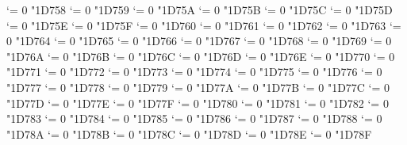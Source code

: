 {  \Umathcode `\Γ = 0 \unimathfam "1D758
  \Umathcode `\Δ = 0 \unimathfam "1D759
  \Umathcode `\Ε = 0 \unimathfam "1D75A
  \Umathcode `\Ζ = 0 \unimathfam "1D75B
  \Umathcode `\Η = 0 \unimathfam "1D75C
  \Umathcode `\Θ = 0 \unimathfam "1D75D
  \Umathcode `\Ι = 0 \unimathfam "1D75E
  \Umathcode `\Κ = 0 \unimathfam "1D75F
  \Umathcode `\Λ = 0 \unimathfam "1D760
  \Umathcode `\Μ = 0 \unimathfam "1D761
  \Umathcode `\Ν = 0 \unimathfam "1D762
  \Umathcode `\Ξ = 0 \unimathfam "1D763
  \Umathcode `\Ο = 0 \unimathfam "1D764
  \Umathcode `\Π = 0 \unimathfam "1D765
  \Umathcode `\Ρ = 0 \unimathfam "1D766
  \Umathcode `\ϴ = 0 \unimathfam "1D767
  \Umathcode `\Σ = 0 \unimathfam "1D768
  \Umathcode `\Τ = 0 \unimathfam "1D769
  \Umathcode `\Υ = 0 \unimathfam "1D76A
  \Umathcode `\Φ = 0 \unimathfam "1D76B
  \Umathcode `\Χ = 0 \unimathfam "1D76C
  \Umathcode `\Ψ = 0 \unimathfam "1D76D
  \Umathcode `\Ω = 0 \unimathfam "1D76E
  \Umathcode `\α = 0 \unimathfam "1D770
  \Umathcode `\β = 0 \unimathfam "1D771
  \Umathcode `\γ = 0 \unimathfam "1D772
  \Umathcode `\δ = 0 \unimathfam "1D773
  \Umathcode `\ε = 0 \unimathfam "1D774
  \Umathcode `\ζ = 0 \unimathfam "1D775
  \Umathcode `\η = 0 \unimathfam "1D776
  \Umathcode `\θ = 0 \unimathfam "1D777
  \Umathcode `\ι = 0 \unimathfam "1D778
  \Umathcode `\κ = 0 \unimathfam "1D779
  \Umathcode `\λ = 0 \unimathfam "1D77A
  \Umathcode `\μ = 0 \unimathfam "1D77B
  \Umathcode `\ν = 0 \unimathfam "1D77C
  \Umathcode `\ξ = 0 \unimathfam "1D77D
  \Umathcode `\ο = 0 \unimathfam "1D77E
  \Umathcode `\π = 0 \unimathfam "1D77F
  \Umathcode `\ρ = 0 \unimathfam "1D780
  \Umathcode `\ς = 0 \unimathfam "1D781
  \Umathcode `\σ = 0 \unimathfam "1D782
  \Umathcode `\τ = 0 \unimathfam "1D783
  \Umathcode `\υ = 0 \unimathfam "1D784
  \Umathcode `\ϕ = 0 \unimathfam "1D785
  \Umathcode `\χ = 0 \unimathfam "1D786
  \Umathcode `\ψ = 0 \unimathfam "1D787
  \Umathcode `\ω = 0 \unimathfam "1D788
  \Umathcode `\ϵ = 0 \unimathfam "1D78A
  \Umathcode `\ϑ = 0 \unimathfam "1D78B
  \Umathcode `\ϰ = 0 \unimathfam "1D78C
  \Umathcode `\φ = 0 \unimathfam "1D78D
  \Umathcode `\ϱ = 0 \unimathfam "1D78E
  \Umathcode `\ϖ = 0 \unimathfam "1D78F
\fi
\tensfbf}
\let\bfsf=\sfbf

